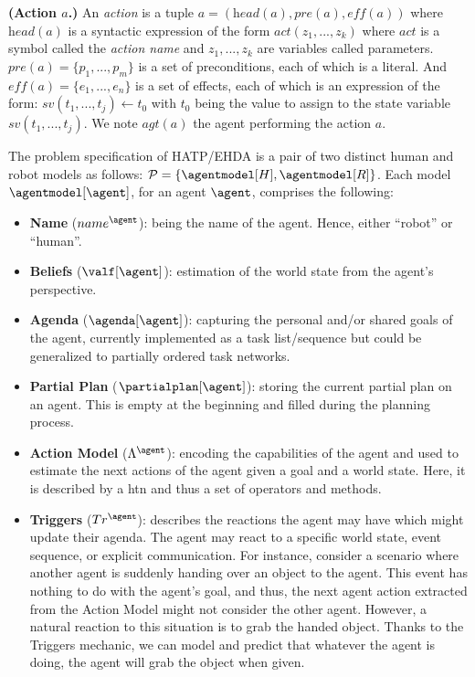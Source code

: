\begin{definition}
    \textbf{(Action $a$.)} An \emph{action} is a tuple $a = (\textit{head}(a), \textit{pre}(a), \textit{eff}(a))$ where $\textit{head}(a)$ is a syntactic expression of the form $\textit{act}(z_1, ..., z_k)$ where $act$ is a symbol called the \emph{action name} and $z_1,...,z_k$ are variables called parameters. $\textit{pre}(a) = \{ p_1, ..., p_m \}$ is a set of preconditions, each of which is a literal. And $\textit{eff}(a) = \{ e_1, ..., e_n \}$ is a set of effects, each of which is an expression of the form: $sv(t_1, ..., t_j) \leftarrow t_0$ with $t_0$ being the value to assign to the state variable $sv(t_1, ..., t_j)$. We note $\textit{agt}(a)$ the agent performing the action $a$.
    \label{def:action}
\end{definition}


The problem specification of HATP/EHDA is a pair of two distinct human and robot models as follows: $\mathcal{P} = \{ \agentmodel[H], \agentmodel[R] \}$. Each model $\agentmodel[\agent]$, for an agent $\agent$, comprises the following:
\begin{itemize}
    \item \textbf{Name} ($name^{\agent}$): being the name of the agent. Hence, either ``robot'' or ``human''.
    
    \item \textbf{Beliefs} ($\valf[\agent]$): estimation of the world state from the agent's perspective.
    
    \item \textbf{Agenda} ($\agenda[\agent]$): capturing the personal and/or shared goals of the agent, currently implemented as a task list/sequence but could be generalized to partially ordered task networks.
    
    \item \textbf{Partial Plan} ($\partialplan[\agent]$): storing the current partial plan on an agent. This is empty at the beginning and filled during the planning process.
    
    \item \textbf{Action Model} ($\Lambda^{\agent}$): encoding the capabilities of the agent and used to estimate the next actions of the agent given a goal and a world state. Here, it is described by a \acrfull{htn} and thus a set of operators and methods. 
    
    \item \textbf{Triggers} ($Tr^{\agent}$): describes the reactions the agent may have which might update their agenda. The agent may react to a specific world state, event sequence, or explicit communication. For instance, consider a scenario where another agent is suddenly handing over an object to the agent. This event has nothing to do with the agent's goal, and thus, the next agent action extracted from the Action Model might not consider the other agent. However, a natural reaction to this situation is to grab the handed object. Thanks to the Triggers mechanic, we can model and predict that whatever the agent is doing, the agent will grab the object when given.  
\end{itemize}

